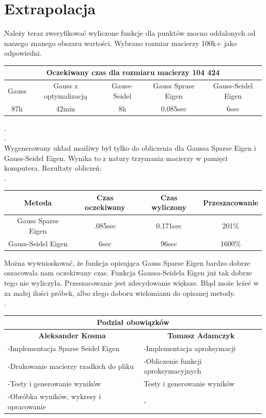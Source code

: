 \documentclass[8pt]{article}
\begin{document}
\section*{Extrapolacja}
Należy teraz zweryfikować wyliczone funkcje dla punktów mocno oddalonych od naszego znanego obszaru wartości. Wybrano rozmiar macierzy 100k+ jako odpowiedni.
\begin{center}
\begin{tabular}{ | c | c | c | c | c | }
  \hline
  \multicolumn{5}{|c|}{\textbf{Oczekiwany czas dla rozmiaru macierzy 104 424}} \\
  \hline
  Gauss & Gauss z optymalizacją & Gauss-Seidel &Gauss Sprase Eigen &Gauss-Seidel Eigen \\\hline
  87h & 42min & 8h &0.085sec &6sec \\\hline
  
  \hline
   \hline
\end{tabular}
.\\. \\

Wygenerowany układ możliwy był tylko do obliczenia dla Gaussa Sparse Eigen i Gauss-Seidel Eigen. Wynika to z natury trzymania macierzy w pamięci komputera. Rezultaty obliczeń:\\
.\\
\begin{tabular}{ | c | c | c | c | }
\hline
\hline
  Metoda & Czas oczekiwany & Czas wyliczony & Przeszacowanie\\\hline
   \rowcolor{Lightc}
  Gauss Sparse Eigen & .085sec & 0.171sec & 201\% \\\hline
   \rowcolor{Lightccc}
  Gauss-Seidel Eigen & 6sec & 96sec & 1600\% \\\hline
  
  \hline
\end{tabular}
\end{center}
Można wywnioskować, że funkcja opisująca Gauss Sparse Eigen bardzo dobrze oszacowala nam oczekiwany czas. Funkcja Gaussa-Seidela Eigen już tak dobrze tego nie wyliczyła. Przeszacowanie jest zdecydowanie większe. Błąd może leżeć w za małej ilości próbek, albo złego doboru wielomianu do opisanej metody.\\
.\\

\renewcommand{\arraystretch}{1}
\begin{tabular}{ | p{8.2cm} | p{8.2cm} | }
  \hline
  \multicolumn{2}{|c|}{Podział obowiązków} \\
  \hline
  \multicolumn{1}{|c|}{\textbf{Aleksander Kosma} }& \multicolumn{1}{|c|}{\textbf{Tomasz Adamczyk}} \\
  \hline
  -Implementacja Sparse Seidel Eigen & -Implementacja aproksymacji \\\hline
   -Drukowanie macierzy rzadkich do pliku & -Obliczenie funkcji aproksymacyjnych \\\hline
  -Testy i generowanie wyników & Testy i generowanie wyników \\\hline
  -Obróbka wyników, wykresy i opracowanie & - \\\hline
  
  \hline
\end{tabular}
\end{document}

